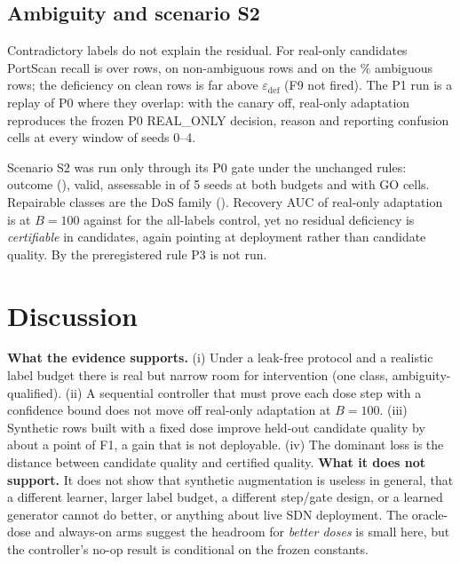 \documentclass[conference]{IEEEtran}
\newcommand{\Rrec}{R\mbox{-}recovery}
\newcommand{\eps}{\varepsilon}
\begin{document}
\begin{table}[t]\centering\caption{Controls, ablations and references (deployed \Rrec{}, paired difference against Ctrl+SMOTE for ablations and against real-only otherwise).}\label{tab:abl}\scriptsize
\resizebox{\columnwidth}{!}{}\end{table}

\subsection{Ambiguity and scenario S2}
Contradictory labels do not explain the residual. For real-only candidates PortScan recall is \recallAll{} over \nGoRows{} rows, \recallClean{} on non-ambiguous rows and \recallAmbig{} on the \shareAmbig\% ambiguous rows; the deficiency on clean rows is far above $\eps_{\mathrm{def}}$ (F9 not fired). The P1 run is a replay of P0 where they overlap: with the canary off, real-only adaptation reproduces the frozen P0 REAL\_ONLY decision, reason and reporting confusion cells at every window of seeds 0--4.

Scenario S2 was run only through its P0 gate under the unchanged rules: outcome \sTwoOutcome{} (\sTwoScope), valid, assessable in \sTwoAssessSeeds{} of 5 seeds at both budgets and with \sTwoGoCells{} GO cells. Repairable classes are the DoS family (\sTwoR). Recovery AUC of real-only adaptation is \sTwoAucBOneZeroZeroRealOnly{} at $B{=}100$ against \sTwoAucBOneZeroZeroRealOnlyAllLabels{} for the all-labels control, yet no residual deficiency is \emph{certifiable} in candidates, again pointing at deployment rather than candidate quality. By the preregistered rule P3 is not run.

\section{Discussion}
\textbf{What the evidence supports.} (i) Under a leak-free protocol and a realistic label budget there is real but narrow room for intervention (one class, ambiguity-qualified). (ii) A sequential controller that must prove each dose step with a confidence bound does not move off real-only adaptation at $B{=}100$. (iii) Synthetic rows built with a fixed dose improve held-out candidate quality by about a point of F1, a gain that is not deployable. (iv) The dominant loss is the distance between candidate quality and certified quality. \textbf{What it does not support.} It does not show that synthetic augmentation is useless in general, that a different learner, larger label budget, a different step/gate design, or a learned generator cannot do better, or anything about live SDN deployment. The oracle-dose and always-on arms suggest the headroom for \emph{better doses} is small here, but the controller's no-op result is conditional on the frozen constants.
\end{document}
